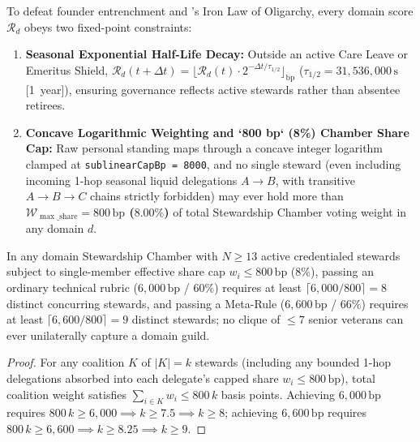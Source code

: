 To defeat founder entrenchment and \textcite{michels1911}'s Iron Law of Oligarchy, every domain
score $\mathcal{R}_d$ obeys two fixed-point constraints:
\begin{enumerate}
\item \textbf{Seasonal Exponential Half-Life Decay:} Outside an active Care Leave or Emeritus
        Shield, $\mathcal{R}_d(t + \Delta t) = \lfloor \mathcal{R}_d(t) \cdot 2^{-\Delta t /
        \tau_{1/2}} \rfloor_{\mathrm{bp}}$ ($\tau_{1/2} = 31{,}536{,}000\,\mathrm{s}$ [1~year]),
        ensuring governance reflects active stewards rather than absentee retirees.
\item \textbf{Concave Logarithmic Weighting and `800 bp` (8\%) Chamber Share Cap:} Raw personal
        standing maps through a concave integer logarithm clamped at \texttt{sublinearCapBp =
        8000}, and no single steward (even including incoming 1-hop seasonal liquid delegations
        $A \to B$, with transitive $A \to B \to C$ chains strictly forbidden) may ever hold more
        than \textbf{$\mathcal{W}_{\max\_\mathrm{share}} = 800\,\mathrm{bp}$ ($8.00\%$)} of total
        Stewardship Chamber voting weight in any domain $d$.
\end{enumerate}

\begin{theorem}
\label{thm:ch4-anti-oligarchy}
In any domain Stewardship Chamber with $N \ge 13$ active credentialed stewards subject to single-member
effective share cap $w_i \le 800\,\mathrm{bp}$ ($8\%$), passing an ordinary technical rubric
($6{,}000\,\mathrm{bp}$ / $60\%$) requires at least $\lceil 6{,}000 / 800 \rceil = 8$ distinct
concurring stewards, and passing a Meta-Rule ($6{,}600\,\mathrm{bp}$ / $66\%$) requires at least
$\lceil 6{,}600 / 800 \rceil = 9$ distinct stewards; no clique of $\le 7$ senior veterans can
ever unilaterally capture a domain guild.
\end{theorem}

\begin{proof}
For any coalition $K$ of $|K| = k$ stewards (including any bounded 1-hop delegations absorbed into
each delegate's capped share $w_i \le 800\,\mathrm{bp}$), total coalition weight satisfies
$\sum_{i \in K} w_i \le 800\,k$ basis points. Achieving $6{,}000\,\mathrm{bp}$ requires
$800\,k \ge 6{,}000 \implies k \ge 7.5 \implies k \ge 8$; achieving $6{,}600\,\mathrm{bp}$
requires $800\,k \ge 6{,}600 \implies k \ge 8.25 \implies k \ge 9$.
\end{proof}

